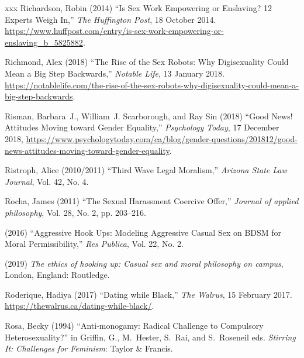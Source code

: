 \documentclass[]{jlreq} \usepackage{mystyle}
\begin{document}
\begin{thebibliography}{xxx}
Richardson, Robin (2014) ``Is Sex Work Empowering or Enslaving? 12 Experts
  Weigh In,'' \emph{The Huffington Post}, 18 October 2014.
  \url{https://www.huffpost.com/entry/is-sex-work-empowering-or-enslaving_b_5825882}.

Richmond, Alex (2018) ``The Rise of the Sex Robots: Why Digisexuality Could
  Mean a Big Step Backwards,'' \emph{Notable Life}, 13 January 2018.
  \url{https://notablelife.com/the-rise-of-the-sex-robots-why-digisexuality-could-mean-a-big-step-backwards}.

Risman, Barbara~J., William~J. Scarborough, and Ray Sin (2018) ``Good News!
  Attitudes Moving toward Gender Equality,'' \emph{Psychology Today}, 17
  December 2018,
  \url{https://www.psychologytoday.com/ca/blog/gender-questions/201812/good-news-attitudes-moving-toward-gender-equality}.

Ristroph, Alice (2010/2011) ``Third Wave Legal Moralism,'' \textit{ Arizona
  State Law Journal}, Vol. 42, No. 4.

Rocha, James (2011) ``The Sexual Harassment Coercive Offer,'' \textit{ Journal
  of applied philosophy}, Vol. 28, No. 2, pp. 203--216.

 \bysame{}  (2016) ``Aggressive Hook Ups: Modeling Aggressive Casual Sex on
  BDSM for Moral Permissibility,'' \textit{ Res Publica}, Vol. 22, No. 2.

 \bysame{}  (2019)  \textit{ The ethics of hooking up: Casual sex and moral
  philosophy on campus}, London, England: Routledge.

Roderique, Hadiya (2017) ``Dating while Black,'' \emph{The Walrus}, 15 February
  2017. \url{https://thewalrus.ca/dating-while-black/}.

Rosa, Becky (1994) ``Anti-monogamy: Radical Challenge to Compulsory
  Heterosexuality?'' in Griffin, G., M.~Hester, S.~Rai, and S.~Roseneil eds.
  \textit{ Stirring It: Challenges for Feminism}: Taylor \& Francis.


\end{thebibliography}
\end{document}
